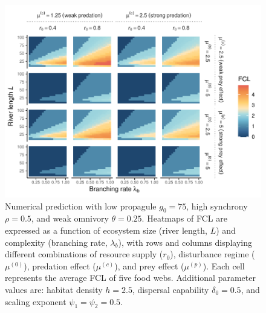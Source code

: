 \begin{figure}
\centering
\includegraphics{../data_fmt/fig_rho05_g75_theta025.pdf}
\caption{Numerical prediction with low propagule \(g_0 = 75\), high
synchrony \(\rho = 0.5\), and weak omnivory \(\theta = 0.25\). Heatmaps
of FCL are expressed as a function of ecosystem size (river length,
\(L\)) and complexity (branching rate, \(\lambda_b\)), with rows and
columns displaying different combinations of resource supply (\(r_0\)),
disturbance regime (\(\mu^{(0)}\)), predation effect (\(\mu^{(c)}\)),
and prey effect (\(\mu^{(p)}\)). Each cell represents the average FCL of
five food webs. Additional parameter values are: habitat density
\(h=2.5\), dispersal capability \(\delta_0=0.5\), and scaling exponent
\(\psi_1=\psi_2=0.5\).\label{fig:fig-num3}}
\end{figure}

\newpage

